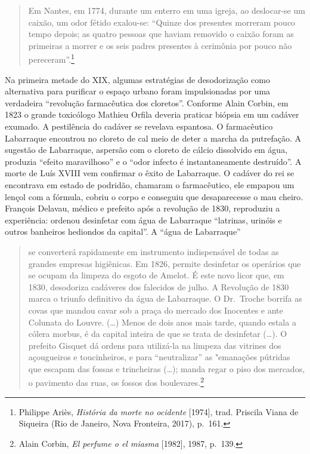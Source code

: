 \begin{quote}
Em Nantes, em 1774, durante um enterro em uma igreja, ao deslocar-se um
caixão, um odor fétido exalou-se: ``Quinze dos presentes morreram pouco
tempo depois; as quatro pessoas que haviam removido o caixão foram as
primeiras a morrer e os seis padres presentes à cerimônia por pouco não
pereceram''.\footnote{Philippe Ariès, \textit{História da morte no
  ocidente} {[}1974{]}, trad. Priscila Viana de Siqueira (Rio de
  Janeiro, Nova Fronteira, 2017), p.~161.}
\end{quote}

Na primeira metade do XIX, algumas estratégias de desodorização como
alternativa para purificar o espaço urbano foram impulsionadas por uma
verdadeira ``revolução farmacêutica dos cloretos''. Conforme Alain
Corbin, em 1823 o grande toxicólogo Mathieu Orfila deveria praticar
biópsia em um cadáver exumado. A pestilência do cadáver se revelava
espantosa. O farmacêutico Labarraque encontrou no cloreto de cal meio de
deter a marcha da putrefação. A sugestão de Labarraque, aspersão com o
cloreto de cálcio dissolvido em água, produzia ``efeito maravilhoso'' e
o ``odor infecto é instantaneamente destruído''. A morte de Luís XVIII
vem confirmar o êxito de Labarraque. O cadáver do rei se encontrava em
estado de podridão, chamaram o farmacêutico, ele empapou um lençol com a
fórmula, cobriu o corpo e conseguiu que desaparecesse o mau
cheiro\textit{.} François Delavau, médico e prefeito após a revolução de
1830, reproduziu a experiência: ordenou desinfetar com água de
Labarraque ``latrinas, urinóis e outros banheiros hediondos da
capital''. A ``água de Labarraque''

\begin{quote}
se converterá rapidamente em instrumento indispensável de todas as
grandes empresas higiênicas. Em 1826, permite desinfetar os operários
que se ocupam da limpeza do esgoto de Amelot\textit{.} É este novo licor
que, em 1830, desodoriza cadáveres dos falecidos de julho. A Revolução
de 1830 marca o triunfo definitivo da água de Labarraque. O Dr.~Troche
borrifa as covas que mandou cavar sob a praça do mercado dos Inocentes e
ante Colunata do Louvre. (\ldots{}) Menos de dois anos mais tarde,
quando estala a cólera morbus, é da capital inteira de que se trata de
desinfetar (\dots{}). O prefeito Gisquet dá ordens para utilizá-la na
limpeza das vitrines dos açougueiros e toucinheiros, e para
``neutralizar'' as "emanações pútridas que escapam das fossas e
trincheiras (\dots{}); manda regar o piso dos mercados, o pavimento das
ruas, os fossos dos boulevares.\footnote{Alain Corbin, \textit{El perfume
  o el miasma} {[}1982{]}, 1987, p.~139.}
\end{quote}

